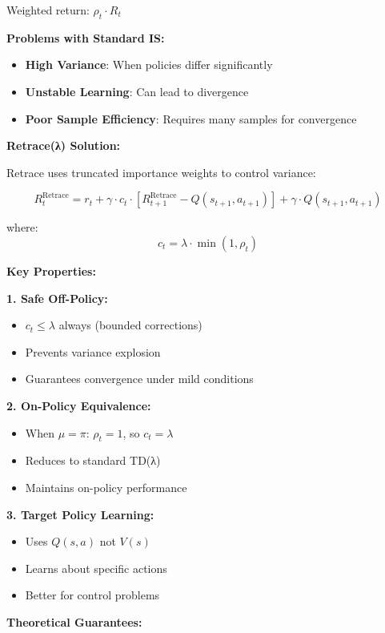 \documentclass[12pt]{article}
\begin{document}
{{Weighted return: $\rho_t \cdot R_t$

\textbf{Problems with Standard IS:}
\begin{itemize}
\item \textbf{High Variance}: When policies differ significantly
\item \textbf{Unstable Learning}: Can lead to divergence
\item \textbf{Poor Sample Efficiency}: Requires many samples for convergence
\end{itemize}

\textbf{Retrace(λ) Solution:}

Retrace uses truncated importance weights to control variance:

\begin{equation}
R_t^{\text{Retrace}} = r_t + \gamma \cdot c_t \cdot [R_{t+1}^{\text{Retrace}} - Q(s_{t+1}, a_{t+1})] + \gamma \cdot Q(s_{t+1}, a_{t+1})
\end{equation}

where:
\begin{equation}
c_t = \lambda \cdot \min(1, \rho_t)
\end{equation}

\textbf{Key Properties:}

\textbf{1. Safe Off-Policy:}
\begin{itemize}
\item $c_t \leq \lambda$ always (bounded corrections)
\item Prevents variance explosion
\item Guarantees convergence under mild conditions
\end{itemize}

\textbf{2. On-Policy Equivalence:}
\begin{itemize}
\item When $\mu = \pi$: $\rho_t = 1$, so $c_t = \lambda$
\item Reduces to standard TD(λ)
\item Maintains on-policy performance
\end{itemize}

\textbf{3. Target Policy Learning:}
\begin{itemize}
\item Uses $Q(s,a)$ not $V(s)$
\item Learns about specific actions
\item Better for control problems
\end{itemize}

\textbf{Theoretical Guarantees:}

}}
\end{document}

